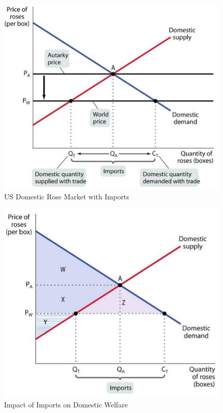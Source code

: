 \documentclass{article}
\begin{document}
\begin{figure}[H]
    \centering
    \includegraphics[scale=0.9]{"Figure 3"}
    \caption{US Domestic Rose Market with Imports}
\end{figure}

\begin{figure}[H]
    \centering
    \includegraphics[scale=0.9]{"Figure 4"}
    \caption{Impact of Imports on Domestic Welfare}
\end{figure}
\end{document}
